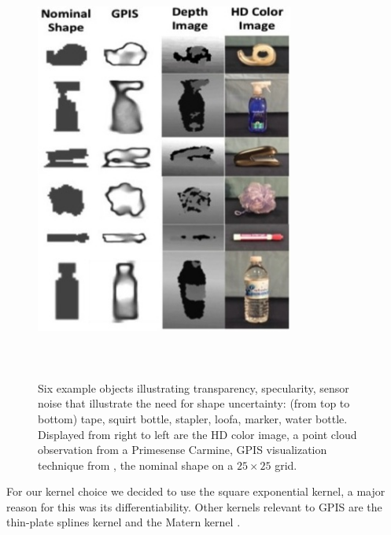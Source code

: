 \documentclass[letterpaper, 10 pt, conference]{ieeeconf}  %
\begin{document}
\begin{figure}[ht!]
\centering
\includegraphics[width = 8.5cm, height = 14cm ]{figures/Slide03.jpg}
\caption{Six example objects illustrating transparency, specularity, sensor noise that illustrate the need for shape uncertainty: (from top to bottom) tape, squirt bottle, stapler, loofa, marker, water bottle. Displayed from right to left are the HD color image, a point cloud observation from a Primesense Carmine, GPIS visualization technique from \cite{jeffs}, the nominal shape on a $25 \times 25$ grid.  }
\vspace*{-10pt}
\label{fig:GPIS_TSDF}
\end{figure}

For our kernel choice we decided to use the square exponential kernel, a major reason for this was its differentiability. Other kernels relevant to GPIS are the thin-plate splines kernel and the Matern kernel \cite{williams2007}. %
\end{document}
